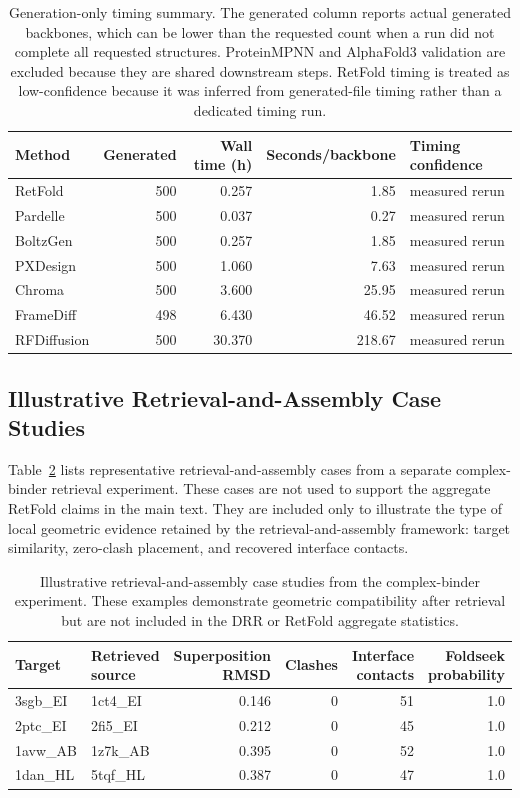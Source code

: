\documentclass[letterpaper]{article} %
\begin{document}
\begin{table}[t]
\centering
\small
\begin{tabular}{lrrrl}
\toprule
Method & Generated & Wall time (h) & Seconds/backbone & Timing confidence \\
\midrule
RetFold & 500 & 0.257 & 1.85 & measured rerun \\
Pardelle & 500 & 0.037 & 0.27 & measured rerun \\
BoltzGen & 500 & 0.257 & 1.85 & measured rerun \\
PXDesign & 500 & 1.060 & 7.63 & measured rerun \\
Chroma & 500 & 3.600 & 25.95 & measured rerun \\
FrameDiff & 498 & 6.430 & 46.52 & measured rerun \\
RFDiffusion & 500 & 30.370 & 218.67 & measured rerun \\
\bottomrule
\end{tabular}
\caption{Generation-only timing summary. The generated column reports actual generated backbones, which can be lower than the requested count when a run did not complete all requested structures. ProteinMPNN and AlphaFold3 validation are excluded because they are shared downstream steps. RetFold timing is treated as low-confidence because it was inferred from generated-file timing rather than a dedicated timing run.}
\label{tab:app_timing}
\end{table}

\subsection{Illustrative Retrieval-and-Assembly Case Studies}

Table~\ref{tab:app_cases} lists representative retrieval-and-assembly cases from a separate complex-binder retrieval experiment. These cases are not used to support the aggregate RetFold claims in the main text. They are included only to illustrate the type of local geometric evidence retained by the retrieval-and-assembly framework: target similarity, zero-clash placement, and recovered interface contacts.

\begin{table}[t]
\centering
\small
\begin{tabular}{llrrrr}
\toprule
Target & Retrieved source & Superposition RMSD & Clashes & Interface contacts & Foldseek probability \\
\midrule
3sgb\_EI & 1ct4\_EI & 0.146 & 0 & 51 & 1.0 \\
2ptc\_EI & 2fi5\_EI & 0.212 & 0 & 45 & 1.0 \\
1avw\_AB & 1z7k\_AB & 0.395 & 0 & 52 & 1.0 \\
1dan\_HL & 5tqf\_HL & 0.387 & 0 & 47 & 1.0 \\
\bottomrule
\end{tabular}
\caption{Illustrative retrieval-and-assembly case studies from the complex-binder experiment. These examples demonstrate geometric compatibility after retrieval but are not included in the DRR or RetFold aggregate statistics.}
\label{tab:app_cases}
\end{table}
\end{document}
